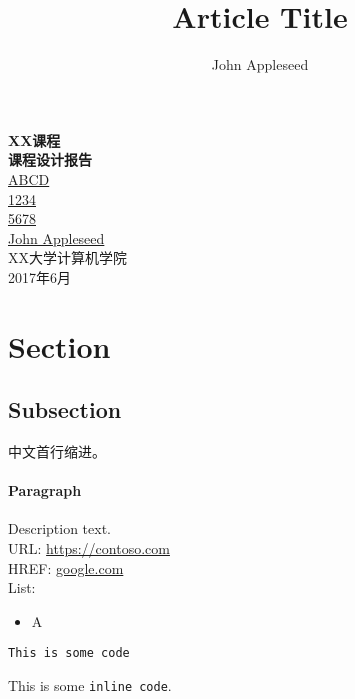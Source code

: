 \documentclass{ctexart} %
\title{Article Title}
\author{John Appleseed}
\newcommand{\code}{\texttt}
\begin{document}
\begin{titlepage}
\begin{center}
\textsf{
\fontsize{24pt}{28pt}\selectfont
\break
\textbf{XX课程\\课程设计报告\\}
\fontsize{16pt}{16pt}\selectfont
\vspace*{7\baselineskip}
\fontsize{16pt}{32pt}\selectfont
\begingroup
{}
\rightskip\leftskip
{}\space\uline{\hfill ABCD\hfill}\space\\
\space\uline{\hfill 1234\hfill}\space\\
\space\uline{\hfill 5678\hfill}\space\\
\space\uline{\hfill John Appleseed\hfill}\space\\
\endgroup
\vspace*{\fill}
\fontsize{18pt}{20pt}\selectfont
XX大学计算机学院\\
2017年6月\\
\vspace*{2\baselineskip}
}
\end{center}
\end{titlepage}
\maketitle
\tableofcontents
\newpage
\section{Section}  
\subsection{Subsection}

中文首行缩进。

\paragraph{Paragraph}
Description text.
\\
URL: \url{https://contoso.com}\\
HREF: \href{https://google.com/}{google.com}\\

List: 
\begin{itemize}  
\item A
\end{itemize}


\begin{lstlisting}
This is some code
\end{lstlisting}

This is some \code{inline code}.
\end{document}
